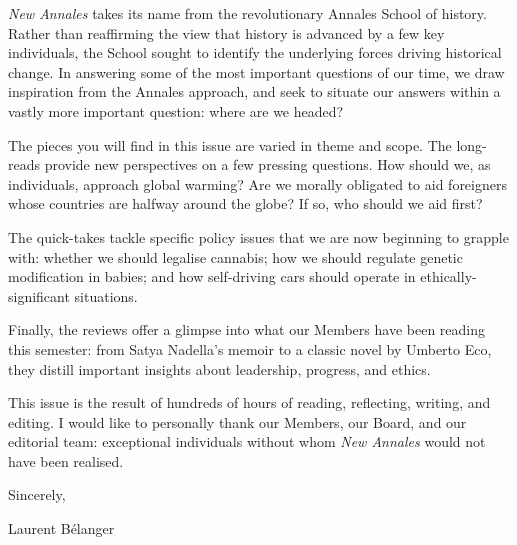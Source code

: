 
 \emph{New Annales} takes its name from the revolutionary Annales School of history. Rather than reaffirming the view that history is advanced by a few key individuals, the School sought to identify the underlying forces driving historical change. In answering some of the most important questions of our time, we draw inspiration from the Annales approach, and seek to situate our answers within a vastly more important question: where are we headed?

The pieces you will find in this issue are varied in theme and scope. The long-reads provide new perspectives on a few pressing questions. How should we, as individuals, approach global warming? Are we morally obligated to aid foreigners whose countries are halfway around the globe? If so, who should we aid first? 

The quick-takes tackle specific policy issues that we are now beginning to grapple with: whether we should legalise cannabis; how we should regulate genetic modification in babies; and how self-driving cars should operate in ethically-significant situations.

Finally, the reviews offer a glimpse into what our Members have been reading this semester: from Satya Nadella's memoir to a classic novel by Umberto Eco, they distill important insights about leadership, progress, and ethics.

This issue is the result of hundreds of hours of reading, reflecting, writing, and editing. I would like to personally thank our Members, our Board, and our editorial team: exceptional individuals without whom \emph{New Annales} would not have been realised.

Sincerely,

Laurent B\'elanger 